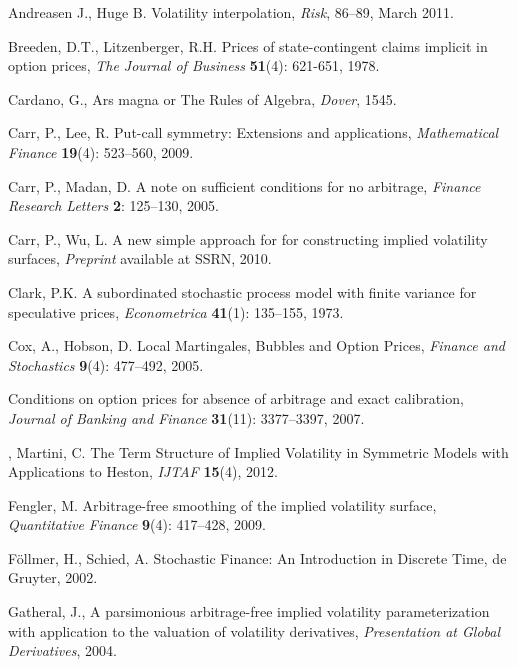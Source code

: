 \documentclass[12pt]{article}
\numberwithin{equation}{section}
\begin{document}
\begin{thebibliography}{}

{Andreasen J.}, {Huge B.}
Volatility interpolation, {\em Risk},  86--89, March 2011. 

{Breeden, D.T.}, {Litzenberger, R.H.}
Prices of state-contingent claims implicit in option prices,
{\em The Journal of Business} {\bf 51}(4): 621-651, 1978.


{Cardano, G.},
{Ars magna or The Rules of Algebra},
{\em Dover}, 1545.

{Carr, P.}, {Lee, R.}
Put-call symmetry: Extensions and applications, {\em Mathematical Finance} {\bf 19}(4): 523--560, 2009.

{Carr, P.}, {Madan, D.}
A note on sufficient conditions for no arbitrage, 
{\em Finance Research Letters} {\bf 2}: 125--130, 2005.

{Carr, P.}, {Wu, L.}
A new simple approach for for constructing implied volatility surfaces, {\em Preprint} available at SSRN, 2010.

 { Clark, P.K.}
A subordinated stochastic process model with finite variance for speculative prices, {\em Econometrica} {\bf 41}(1): 135--155, 1973.

{Cox, A.}, {Hobson, D.}
Local Martingales, Bubbles and Option Prices, 
{\em Finance and Stochastics} {\bf 9}(4): 477--492, 2005.

Conditions on option prices for absence of arbitrage and exact calibration,
{\em Journal of Banking and Finance} {\bf 31}(11): 3377--3397, 2007.

, {Martini, C.}
The Term Structure of Implied Volatility in Symmetric Models with Applications to Heston,
{\em IJTAF} {\bf 15}(4), 2012.

{Fengler, M.}
{Arbitrage-free smoothing of the implied volatility surface}, 
{\em Quantitative Finance} {\bf 9}(4): 417--428, 2009.

{F\"ollmer, H.}, {Schied, A.} 
Stochastic Finance: An Introduction in Discrete Time,
de Gruyter, 2002.

{Gatheral, J.},
{A parsimonious arbitrage-free implied volatility parameterization with application to the valuation of volatility derivatives},
{\em Presentation at Global Derivatives}, 2004.


\end{thebibliography}
\end{document}
